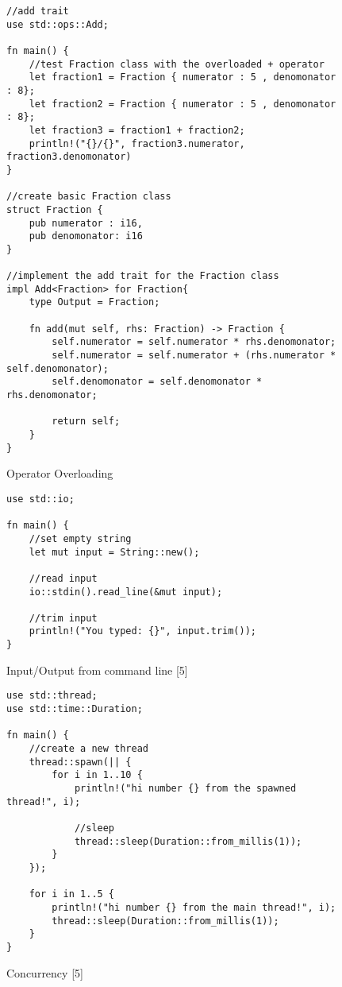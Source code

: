 \documentclass[sigconf,authorversion,nonacm]{acmart}
\begin{document}
\begin{figure} [H] 
\caption{Operator Overloading}
    \begin{lstlisting}
//add trait
use std::ops::Add;

fn main() {
    //test Fraction class with the overloaded + operator
    let fraction1 = Fraction { numerator : 5 , denomonator : 8};
    let fraction2 = Fraction { numerator : 5 , denomonator : 8};
    let fraction3 = fraction1 + fraction2;
    println!("{}/{}", fraction3.numerator, fraction3.denomonator)
}

//create basic Fraction class
struct Fraction {
    pub numerator : i16,
    pub denomonator: i16
}

//implement the add trait for the Fraction class
impl Add<Fraction> for Fraction{
    type Output = Fraction;

    fn add(mut self, rhs: Fraction) -> Fraction {
        self.numerator = self.numerator * rhs.denomonator;
        self.numerator = self.numerator + (rhs.numerator * self.denomonator);
        self.denomonator = self.denomonator * rhs.denomonator;

        return self;
    }
}
    \end{lstlisting}
\end{figure}

\begin{figure} [H] 
\caption{Input/Output from command line [5]}
    \begin{lstlisting}
use std::io;

fn main() {
    //set empty string
    let mut input = String::new();

    //read input
    io::stdin().read_line(&mut input);

    //trim input
    println!("You typed: {}", input.trim());
}
    \end{lstlisting}
\end{figure}

\begin{figure} [H] 
\caption{Concurrency [5]}
    \begin{lstlisting}
use std::thread;
use std::time::Duration;

fn main() {
    //create a new thread
    thread::spawn(|| {
        for i in 1..10 {
            println!("hi number {} from the spawned thread!", i);

            //sleep
            thread::sleep(Duration::from_millis(1));
        }
    });

    for i in 1..5 {
        println!("hi number {} from the main thread!", i);
        thread::sleep(Duration::from_millis(1));
    }
}
    \end{lstlisting}
\end{figure}
\end{document}
